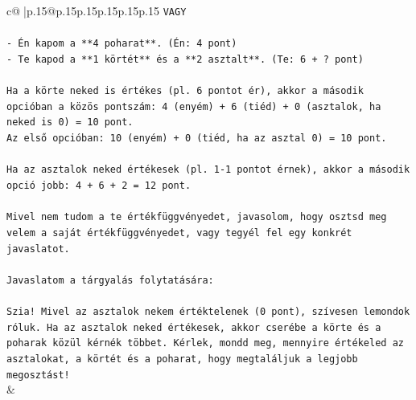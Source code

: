 \documentclass{article}
\begin{document}
{\begin{supertabular}{c@{$\;$}|p{.15\linewidth}@{}p{.15\linewidth}p{.15\linewidth}p{.15\linewidth}p{.15\linewidth}p{.15\linewidth}}
{{{\texttt{VAGY} \\
\\ 
\texttt{{-} Én kapom a **4 poharat**. (Én: 4 pont)} \\
\texttt{{-} Te kapod a **1 körtét** és a **2 asztalt**. (Te: 6 + ? pont)} \\
\\ 
\texttt{Ha a körte neked is értékes (pl. 6 pontot ér), akkor a második opcióban a közös pontszám: 4 (enyém) + 6 (tiéd) + 0 (asztalok, ha neked is 0) = 10 pont.} \\
\texttt{Az első opcióban: 10 (enyém) + 0 (tiéd, ha az asztal 0) = 10 pont.} \\
\\ 
\texttt{Ha az asztalok neked értékesek (pl. 1{-}1 pontot érnek), akkor a második opció jobb: 4 + 6 + 2 = 12 pont.} \\
\\ 
\texttt{Mivel nem tudom a te értékfüggvényedet, javasolom, hogy osztsd meg velem a saját értékfüggvényedet, vagy tegyél fel egy konkrét javaslatot.} \\
\\ 
\texttt{Javaslatom a tárgyalás folytatására:} \\
\\ 
\texttt{Szia! Mivel az asztalok nekem értéktelenek (0 pont), szívesen lemondok róluk. Ha az asztalok neked értékesek, akkor cserébe a körte és a poharak közül kérnék többet. Kérlek, mondd meg, mennyire értékeled az asztalokat, a körtét és a poharat, hogy megtaláljuk a legjobb megosztást!} \\
            }
        }
    }
    & \\ \\


\end{supertabular}}
\end{document}
